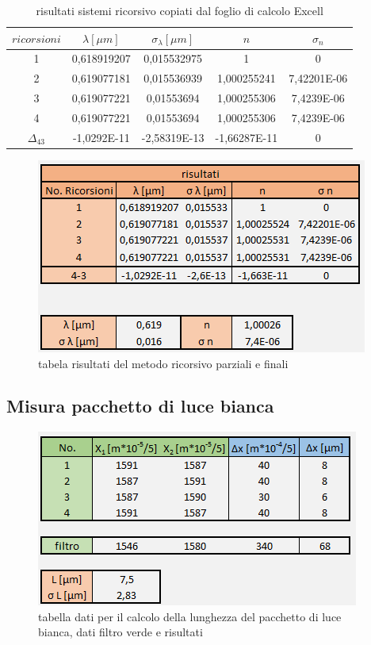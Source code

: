 \documentclass{article}
\begin{document}
\begin{table}[h!]
\centering
\begin{tabular}{ | c | c | c | c | c | }
\hline
 $ricorsioni$ & $\lambda [\mu m]$ & $\sigma_\lambda [\mu m]$ & $n$ & $\sigma_n$\\
\hline
 1 & 0,618919207 & 0,015532975 & 1 & 0\\
 2 & 0,619077181 & 0,015536939 & 1,000255241 & 7,42201E-06\\
 3 & 0,619077221 & 0,01553694 & 1,000255306 & 7,4239E-06\\
 4 & 0,619077221 & 0,01553694 & 1,000255306 & 7,4239E-06\\
\hline
 $\Delta_{4 3}$ & -1,0292E-11 & -2,58319E-13 & -1,66287E-11 & 0\\
\hline
\end{tabular}
\caption{risultati sistemi ricorsivo copiati dal foglio di calcolo Excell}
\label{table:6}
\end{table}

\begin{figure}[h!]
  \centering
  \includegraphics[width=0.6\linewidth]{IM tabella ricorsione}
  \caption{tabela risultati del metodo ricorsivo parziali e finali}
\end{figure}

\subsection{Misura pacchetto di luce bianca}

\begin{figure}[h!]
  \centering
  \includegraphics[width=0.6\linewidth]{IM tabella pacchetto}
  \caption{tabella dati per il calcolo della lunghezza del pacchetto di luce bianca, dati filtro verde e risultati}
\end{figure}
\end{document}

